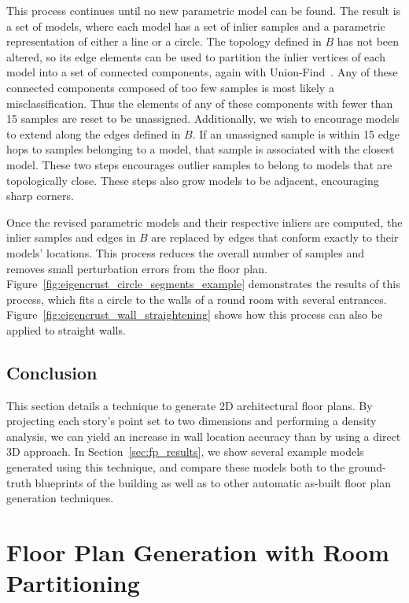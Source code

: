 \documentclass[12pt,onecolumn,oneside]{book}
\begin{document}
This process continues until no new parametric model can be found.  The result is a set of models, where each model has a set of inlier samples and a parametric representation of either a line or a circle.  The topology defined in $B$ has not been altered, so its edge elements can be used to partition the inlier vertices of each model into a set of connected components, again with Union-Find~\cite{Unionfind}.  Any of these connected components composed of too few samples is most likely a misclassification.  Thus the elements of any of these components with fewer than 15 samples are reset to be unassigned.  Additionally, we wish to encourage models to extend along the edges defined in $B$.  If an unassigned sample is within 15 edge hops to samples belonging to a model, that sample is associated with the closest model.  These two steps encourages outlier samples to belong to models that are topologically close.  These steps also grow models to be adjacent, encouraging sharp corners.

Once the revised parametric models and their respective inliers are computed, the inlier samples and edges in $B$ are replaced by edges that conform exactly to their models' locations.  This process reduces the overall number of samples and removes small perturbation errors from the floor plan.  Figure~\ref{fig:eigencrust_circle_segments_example} demonstrates the results of this process, which fits a circle to the walls of a round room with several entrances. Figure~\ref{fig:eigencrust_wall_straightening} shows how this process can also be applied to straight walls.

\subsection{Conclusion}
\label{ssec:eigencrust_conclusion}

This section details a technique to generate 2D architectural floor plans.  By projecting each story's point set to two dimensions and performing a density analysis, we can yield an increase in wall location accuracy than by using a direct 3D approach. In Section~\ref{sec:fp_results}, we show several example models generated using this technique, and compare these models both to the ground-truth blueprints of the building as well as to other automatic as-built floor plan generation techniques.

\section{Floor Plan Generation with Room Partitioning}
\label{sec:visigrapp}
\end{document}
